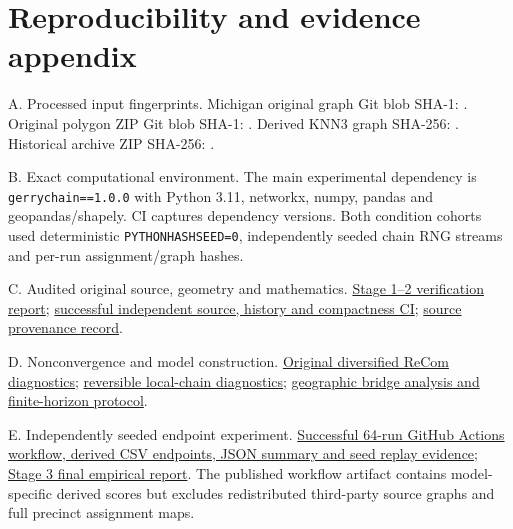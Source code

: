 \documentclass[
  10pt,
]{article}
\begin{document}
\clearpage
\appendix

\hypertarget{reproducibility-and-evidence-appendix}{%
\section{Reproducibility and evidence
appendix}\label{reproducibility-and-evidence-appendix}}

A. Processed input fingerprints. Michigan original graph Git blob SHA-1:
\texttt{}. Original
polygon ZIP Git blob SHA-1:
\texttt{}. Derived
KNN3 graph SHA-256:
\texttt{}.
Historical archive ZIP SHA-256:
\texttt{}.

B. Exact computational environment. The main experimental dependency is
\texttt{gerrychain==1.0.0} with Python 3.11, networkx, numpy, pandas and
geopandas/shapely. CI captures dependency versions. Both condition
cohorts used deterministic \texttt{PYTHONHASHSEED=0}, independently
seeded chain RNG streams and per-run assignment/graph hashes.

C. Audited original source, geometry and mathematics.
\href{https://github.com/DjokovicMan22/Gerrymandering-Project/blob/research/stages-1-3-validation/docs/research_audit/STAGE12_FINAL_VERIFICATION.md}{Stage
1--2 verification report};
\href{https://github.com/DjokovicMan22/Gerrymandering-Project/actions/runs/39183949679}{successful
independent source, history and compactness CI};
\href{https://github.com/DjokovicMan22/Gerrymandering-Project/blob/research/stages-1-3-validation/docs/data_provenance.md}{source
provenance record}.

D. Nonconvergence and model construction.
\href{https://github.com/DjokovicMan22/Gerrymandering-Project/blob/research/stages-1-3-validation/docs/research_audit/stage3_diversified_sampling_results.md}{Original
diversified ReCom diagnostics};
\href{https://github.com/DjokovicMan22/Gerrymandering-Project/blob/research/stages-1-3-validation/docs/research_audit/stage3_reversible_mixing_results.md}{reversible
local-chain diagnostics};
\href{https://github.com/DjokovicMan22/Gerrymandering-Project/blob/research/stages-1-3-validation/docs/research_audit/stage3_finite_horizon_protocol.md}{geographic
bridge analysis and finite-horizon protocol}.

E. Independently seeded endpoint experiment.
\href{https://github.com/DjokovicMan22/Gerrymandering-Project/actions/runs/39180152601}{Successful
64-run GitHub Actions workflow, derived CSV endpoints, JSON summary and
seed replay evidence};
\href{https://github.com/DjokovicMan22/Gerrymandering-Project/blob/research/stages-1-3-validation/docs/research_audit/STAGE3_FINAL_REPORT.md}{Stage
3 final empirical report}. The published workflow artifact contains
model-specific derived scores but excludes redistributed third-party
source graphs and full precinct assignment maps.
\end{document}
